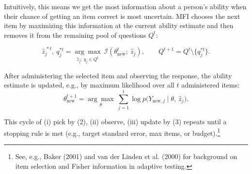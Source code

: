 \documentclass{article}
\begin{document}
Intuitively, this means we get the most information about a person's ability when their chance of getting an item correct is most uncertain. MFI chooses the next item by maximizing this information at the current ability estimate and then removes it from the remaining pool of questions $Q^t$:

\[
\hat z^{\,*t}_j,\ q^{*t}_j
= \underset{\hat z_j:\ q_j\in Q^t}{\arg\max}\ \mathcal I\!\left(\theta^{t}_{\text{new}};\ \hat z_j\right),
\qquad
Q^{t+1} = Q^t\setminus\{q^{*t}_j\}.
\tag{2}
\]

After administering the selected item and observing the response, the ability estimate is
updated, e.g., by maximum likelihood over all $t$ administered items:
\[
\theta^{t+1}_{\text{new}}
= \underset{\theta}{\arg\max}\ \sum_{j=1}^{t} \log p\big(Y_{\text{new},j}\mid \theta,\ \hat z_j\big).
\tag{3}
\]

This cycle of (i) pick by (2), (ii) observe, (iii) update by (3) repeats until a stopping
rule is met (e.g., target standard error, max items, or budget).\footnote{See, e.g.,
Baker (2001) and van der Linden et al. (2000) for background on item selection and Fisher
information in adaptive testing.}
\end{document}
